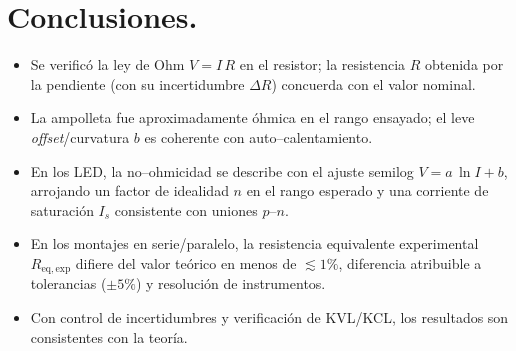 \documentclass[11pt,twocolumn]{article}
\begin{document}
\section{Conclusiones.}
\begin{itemize}
\item Se verificó la ley de Ohm $V = I\,R$ en el resistor; la resistencia $R$ obtenida por la pendiente (con su incertidumbre $\Delta R$) concuerda con el valor nominal.
\item La ampolleta fue aproximadamente óhmica en el rango ensayado; el leve \emph{offset}/curvatura $b$ es coherente con auto–calentamiento.
\item En los LED, la no–ohmicidad se describe con el ajuste semilog $V = a\,\ln I + b$, arrojando un factor de idealidad $n$ en el rango esperado y una corriente de saturación $I_s$ consistente con uniones $p$–$n$. 
\item  En los montajes en serie/paralelo, la resistencia equivalente experimental $R_{\mathrm{eq,exp}}$ difiere del valor teórico en menos de $\lesssim 1\%$, diferencia atribuible a tolerancias ($\pm 5\%$) y resolución de instrumentos.
\item  Con control de incertidumbres y verificación de KVL/KCL, los resultados son consistentes con la teoría.
\end{itemize}

\newpage{}
\onecolumn{}
\printbibliography
\end{document}
